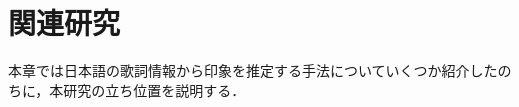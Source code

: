 \documentclass[a4paper,11pt,oneside,openany]{jsbook}
\begin{document}
\chapter{関連研究}
本章では日本語の歌詞情報から印象を推定する手法についていくつか紹介したのちに，本研究の立ち位置を説明する．





%
\end{document}
